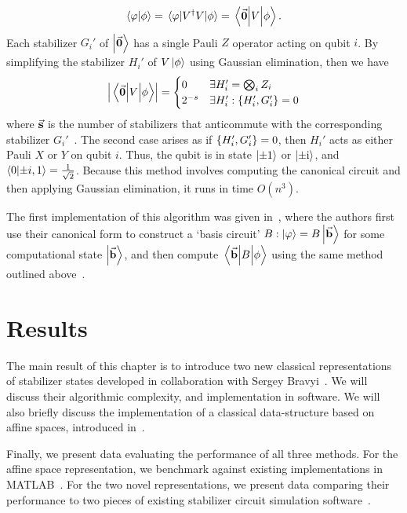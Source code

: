 \[
\braket{\varphi}{\phi} = \matrixel{\varphi}{V^{\dagger}V}{\phi} = \matrixel{\va{0}}{V}{\phi}.
\]
Each stabilizer $G_{i}'$ of $\ket{\va{0}}$ has a single Pauli $Z$ operator acting on qubit $i$. By simplifying the stabilizer $H_{i}'$ of $V\ket{\phi}$ using Gaussian elimination, then we have
\begin{equation}
\left\vert \matrixel{\va{0}}{V}{\phi}\right\vert = \begin{cases}
 0 & \exists H_{i}' = \bigotimes_{i}Z_{i}\\
 2^{-s} & \exists H_{i}' : \acomm{H_{i}'}{G_{i}'} = 0
\end{cases}
\end{equation}
where $\va{s}$ is the number of stabilizers that anticommute with the corresponding stabilizer $G_{i}'$~\cite{Aaronson2004}. The second case arises as if $\acomm{H_{i}'}{G_{i}'} = 0$, then $H_{i}'$ acts as either Pauli $X$ or $Y$ on qubit $i$. Thus, the qubit is in state $\ket{\pm 1}$ or $\ket{\pm\mathrm{i}}$, and $\braket{0}{\pm i,1}=\frac{1}{\sqrt{2}}$. Because this method involves computing the canonical circuit and then applying Gaussian elimination, it runs in time $O(n^{3})$.\par
The first implementation of this algorithm was given in~\cite{Garcia2012}, where the authors first use their canonical form to construct a `basis circuit' $B : \ket{\varphi}=B\ket{\va{b}}$ for some computational state $\ket{\va{b}}$, and then compute $\matrixel{\va{b}}{B}{\phi}$ using the same method outlined above~\cite{Garcia2012}.
\section{Results}
The main result of this chapter is to introduce two new classical representations of stabilizer states developed in collaboration with Sergey Bravyi~\cite{Bravyi2018}. We will discuss their algorithmic complexity, and implementation in software. We will also briefly discuss the implementation of a classical data-structure based on affine spaces, introduced in~\cite{Bravyi2016}.\par
Finally, we  present data evaluating the performance of all three methods. For the affine space representation, we benchmark against existing implementations in MATLAB~\cite{Bravyi2016}. For the two novel representations, we present data comparing their performance to two pieces of existing stabilizer circuit simulation software~\cite{Aaronson2004,Anders2006}.
